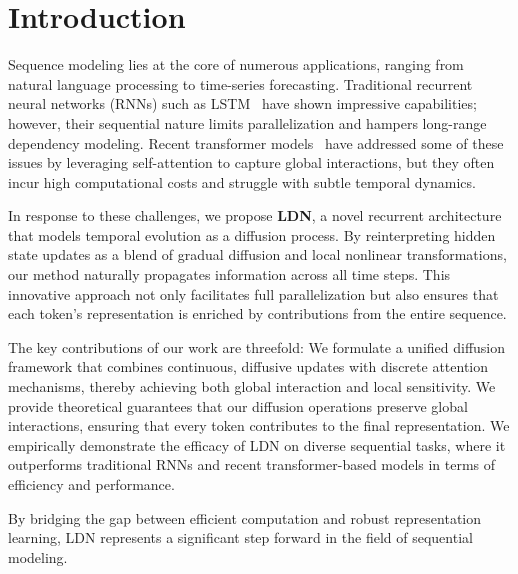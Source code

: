 \section{Introduction}

Sequence modeling lies at the core of numerous applications, ranging from natural language processing to time-series forecasting. Traditional recurrent neural networks (RNNs) such as LSTM~\cite{hochreiter1997long} have shown impressive capabilities; however, their sequential nature limits parallelization and hampers long-range dependency modeling. Recent transformer models~\cite{vaswani2017attention} have addressed some of these issues by leveraging self-attention to capture global interactions, but they often incur high computational costs and struggle with subtle temporal dynamics.

In response to these challenges, we propose \textbf{LDN}, a novel recurrent architecture that models temporal evolution as a diffusion process. By reinterpreting hidden state updates as a blend of gradual diffusion and local nonlinear transformations, our method naturally propagates information across all time steps. This innovative approach not only facilitates full parallelization but also ensures that each token’s representation is enriched by contributions from the entire sequence.

The key contributions of our work are threefold:  We formulate a unified diffusion framework that combines continuous, diffusive updates with discrete attention mechanisms, thereby achieving both global interaction and local sensitivity.
     We provide theoretical guarantees that our diffusion operations preserve global interactions, ensuring that every token contributes to the final representation.
     We empirically demonstrate the efficacy of LDN on diverse sequential tasks, where it outperforms traditional RNNs and recent transformer-based models in terms of efficiency and performance.

By bridging the gap between efficient computation and robust representation learning, LDN represents a significant step forward in the field of sequential modeling.
